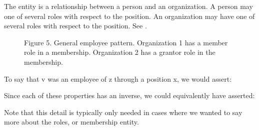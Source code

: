 \documentclass[letterpaper,10pt,english]{sphinxmanual}
\begin{document}
\sphinxAtStartPar
The entity  is a relationship between a person and an organization.  A person
may one of several roles with respect to the position.  An organization may have
one of several roles with respect to the position.  See {\hyperref[\detokenize{associations:figure-5}]{}}.

\begin{figure}[htbp]
\centering
\capstart

\noindent{}
\caption{Figure 5.  General employee pattern.  Organization 1 has a member role in a
membership.  Organization 2 has a grantor role in the membership.}\label{\detokenize{associations:id10}}\label{\detokenize{associations:figure-5}}\end{figure}

\sphinxAtStartPar
To say that v was an employee of z through a position x, we would assert:

\begin{sphinxVerbatim}[commandchars=\\\{\}]
  
  
  
  
  
  
  
\end{sphinxVerbatim}

\sphinxAtStartPar
Since each of these properties has an inverse, we could equivalently have asserted:

\begin{sphinxVerbatim}[commandchars=\\\{\}]
  
  
  
  
  
  
  
\end{sphinxVerbatim}

\sphinxAtStartPar
Note that this detail is typically only needed in cases where we wanted to say more
about the roles, or membership entity.
\end{document}

